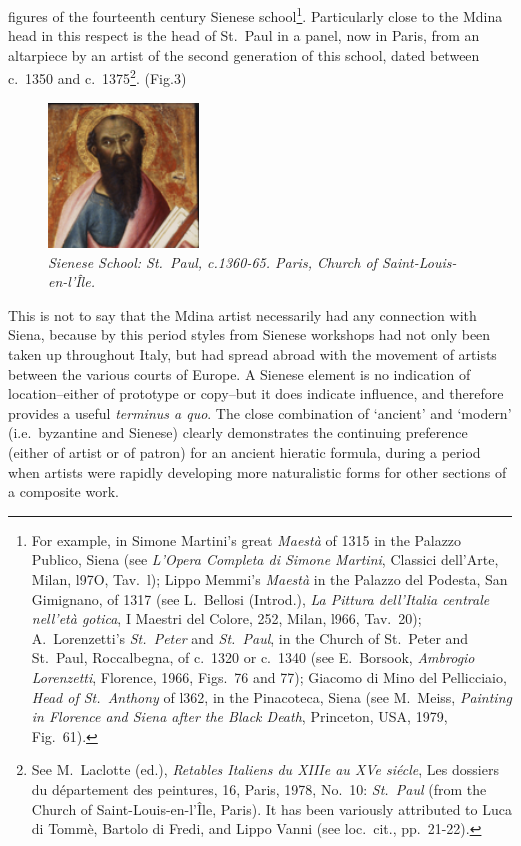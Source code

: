 \documentclass[a4paper,12pt]{article}
\begin{document}
figures of the fourteenth century Sienese school\footnote{For example,
in Simone Martini's great \textit{Maest\`a} of 1315 in the Palazzo
Publico, Siena (see \textit{L'Opera Completa di Simone Martini},
Classici dell'Arte, Milan, l97O, Tav.~l); Lippo Memmi's
\textit{Maest\`a} in the Palazzo del Podesta, San Gimignano, of 1317
(see L.~Bellosi (Introd.), \textit{La Pittura dell'Italia centrale
nell'et\`a gotica}, I Maestri del Colore, 252, Milan, l966, Tav.~20);
A.~Lorenzetti's \textit{St.~Peter} and \textit{St.~Paul}, in the
Church of St.~Peter and St.~Paul, Roccalbegna, of c.~1320 or c.~1340
(see E.~Borsook, \textit{Ambrogio Lorenzetti}, Florence, 1966,
Figs.~76 and 77); Giacomo di Mino del Pellicciaio, \textit{Head of
St.~Anthony} of l362, in the Pinacoteca, Siena (see M.~Meiss,
\textit{Painting in Florence and Siena after the Black Death},
Princeton, USA, 1979, Fig.~61).}.  Particularly close to the Mdina
head in this respect is the head of St.~Paul in a panel, now in Paris,
from an altarpiece by an artist of the second generation of this
school, dated between c.~1350 and c.~1375\footnote{See M.~Laclotte
(ed.), \textit{Retables Italiens du XIIIe au XVe si\'{e}cle}, Les dossiers
du d\'{e}partement des peintures, 16, Paris, 1978, No.~10:
\textit{St.~Paul} (from the Church of Saint-Louis-en-l'\^{I}le, Paris).
It has been variously attributed to Luca di Tomm\`e, Bartolo di Fredi,
and Lippo Vanni (see loc.~cit., pp.~21-22).}. (Fig.3) 
\begin{figure}[htbp]
\centering
\includegraphics[width=4cm]{pics/fig3.png}
\caption[Sienese School: St.~Paul, c.1360-65]
{\it Sienese School: St.~Paul, c.1360-65.  Paris, Church of
Saint-Louis-en-l'\^Ile.}
\end{figure}
This is not to
say that the Mdina artist necessarily had any connection with Siena,
because by this period styles from Sienese workshops had not only been
taken up throughout Italy, but had spread abroad with the movement of
artists between the various courts of Europe.  A Sienese element is no
indication of location--either of prototype or copy--but it does
indicate influence, and therefore provides a useful \textit{terminus a
quo}.  The close combination of `ancient' and `modern' (i.e.~byzantine
and Sienese) clearly demonstrates the continuing preference (either of
artist or of patron) for an ancient hieratic formula, during a period
when artists were rapidly developing more naturalistic forms for other
sections of a composite work.
\end{document}
